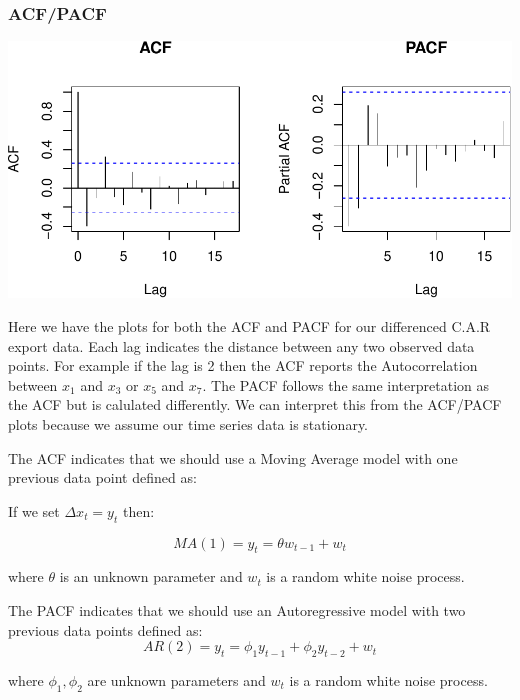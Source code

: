 \documentclass[
]{article}
\begin{document}
\hypertarget{acfpacf}{%
\subsubsection{ACF/PACF}\label{acfpacf}}

\includegraphics{STA_137_Final_Project_files/figure-latex/unnamed-chunk-5-1.pdf}

Here we have the plots for both the ACF and PACF for our differenced
C.A.R export data. Each lag indicates the distance between any two
observed data points. For example if the lag is 2 then the ACF reports
the Autocorrelation between \(x_1\) and \(x_3\) or \(x_5\) and \(x_7\).
The PACF follows the same interpretation as the ACF but is calulated
differently. We can interpret this from the ACF/PACF plots because we
assume our time series data is stationary.

The ACF indicates that we should use a Moving Average model with one
previous data point defined as:

\begin{center}
If we set $\Delta x_t = y_t$ then: 
\end{center}

\[MA(1) = y_t =  \theta w_{t-1} + w_t\]

\begin{center}

where $\theta$ is an unknown parameter and $w_{t}$ is a random white noise process.

The PACF indicates that we should use an Autoregressive model with two previous data points defined as:
\[AR(2) = y_t = \phi_1 y_{t-1} + \phi_2 y_{t-2} + w_t\]

where $\phi_1,\phi_2$ are unknown parameters and $w_{t}$ is a random white noise process.


\end{center}
\end{document}
